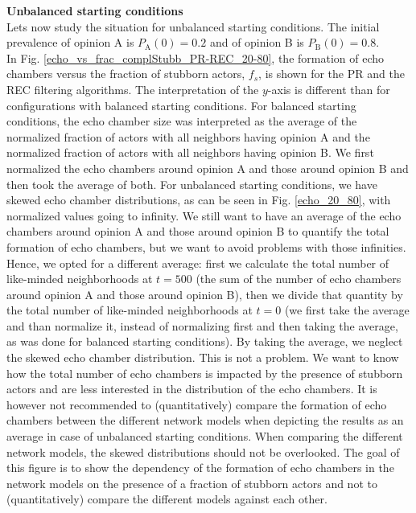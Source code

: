 \documentclass[11 pt , letterpaper , twoside , openright]{book}
\begin{document}
\newline
\textbf{Unbalanced starting conditions}\\
\newline
Lets now study the situation for unbalanced starting conditions. The initial prevalence of opinion A is $P_\text{A}(0) = 0.2$ and of opinion B is $P_\text{B}(0) = 0.8$.\\
\newline
In Fig. \ref{echo_vs_frac_complStubb_PR-REC_20-80}, the formation of echo chambers versus the fraction of stubborn actors, $f_s$, is shown for the PR and the REC filtering algorithms. The interpretation of the $y$-axis is different than for configurations with balanced starting conditions. For balanced starting conditions, the echo chamber size was interpreted as the average of the normalized fraction of actors with all neighbors having opinion A and the normalized fraction of actors with all neighbors having opinion B. We first normalized the echo chambers around opinion A and those around opinion B and then took the average of both. For unbalanced starting conditions, we have skewed echo chamber distributions, as can be seen in Fig. \ref{echo_20_80}, with normalized values going to infinity. We still want to have an average of the echo chambers around opinion A and those around opinion B to quantify the total formation of echo chambers, but we want to avoid problems with those infinities. Hence, we opted for a different average: first we calculate the total number of like-minded neighborhoods at $t=500$ (the sum of the number of echo chambers around opinion A and those around opinion B), then we divide that quantity by the total number of like-minded neighborhoods at $t=0$ (we first take the average and than normalize it, instead of normalizing first and then taking the average, as was done for balanced starting conditions). By taking the average, we neglect the skewed echo chamber distribution. This is not a problem. We want to know how the total number of echo chambers is impacted by the presence of stubborn actors and are less interested in the distribution of the echo chambers.  It is however not recommended to (quantitatively) compare the formation of echo chambers between the different network models when depicting the results as an average in case of unbalanced starting conditions. When comparing the different network models, the skewed distributions should not be overlooked. The goal of this figure is to show the dependency of the formation of echo chambers in the network models on the presence of a fraction of stubborn actors and not to (quantitatively) compare the different models against each other.
\end{document}
